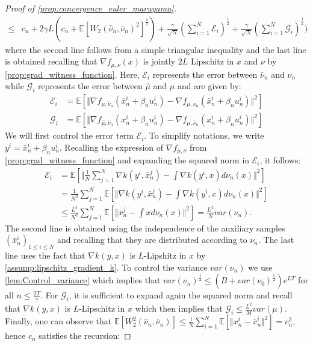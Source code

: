 \begin{proof}[Proof of \cref{prop:convergence_euler_maruyama}]
\begin{align*}
  \leq & c_{n}+2\gamma L(c_{n}+\mathbb{E}[W_{2}(\hat{\nu}_{n},\bar{\nu}_{n})^{2}]^{\frac{1}{2}})+\frac{\gamma}{\sqrt{N}}(\sum_{i=1}^{N}\mathcal{E}_{i})^{\frac{1}{2}}+\frac{\gamma}{\sqrt{N}}(\sum_{i=1}^{N}\mathcal{G}_{i})^{\frac{1}{2}})
\end{align*}
where the second line follows from a simple triangular inequality and the last line is obtained recalling that $\nabla f_{\mu,\nu}(x)$
is jointly $2L$ Lipschitz in $x$ and $\nu$ by \cref{prop:grad_witness_function}. Here, $\mathcal{E}_{i}$ represents the error between $\bar{\nu}_n$ and $\nu_n$ while $\mathcal{G}_{i}$  represents the error between $\hat{\mu}$ and $\mu$ and are given by: 
\begin{align*}
\mathcal{E}_{i} & =\mathbb{E}[\Vert\nabla f_{\mu,\bar{\nu}_{n}}(\bar{x}_{n}^{i}+\beta_{n}u_{n}^{i})-\nabla f_{\mu,\nu_{n}}(\bar{x}_{n}^{i}+\beta_{n}u_{n}^{i})\Vert^{2}]\\
\mathcal{G}_{i} & =\mathbb{E}[\Vert\nabla f_{\hat{\mu},\hat{\nu}_{n}}(x_{n}^{i}+\beta_{n}u_{n}^{i})-\nabla f_{\mu,\hat{\nu}_{n}}(x_{n}^{i}+\beta_{n}u_{n}^{i})\Vert^{2}]
\end{align*}
We will first control the error term $\mathcal{E}_i$. To simplify
notations, we write $y^{i}=\bar{x}_{n}^{i}+\beta_{n}u_{n}^{i}$. Recalling the expression of $\nabla f_{\mu,\nu}$ from \cref{prop:grad_witness_function} and expanding the squared norm in $\mathcal{E}_i$, it follows:
\begin{align*}
\mathcal{E}_{i} & =\mathbb{E}[\Vert\frac{1}{N}\sum_{j=1}^{N}\nabla k(y^{i},\bar{x}_{n}^{j})-\int\nabla k(y^{i},x)d\nu_{n}(x)\Vert^{2}]\\
 & =\frac{1}{N^{2}}\sum_{j=1}^{N}\mathbb{E}\left[\Vert\nabla k(y^{i},\bar{x}_{n}^{j})-\int\nabla k(y^{i},x)d\nu_{n}(x)\Vert^{2}\right]\\
 & \leq\frac{L^{2}}{N^{2}}\sum_{j=1}^{N}\mathbb{E}[\Vert\bar{x}_{n}^{j}-\int xd\nu_{n}(x)\Vert^{2}]=\frac{L^{2}}{N}var(\nu_{n}).
\end{align*}
The second line is obtained using the independence of the auxiliary samples $(\bar{x}^{i}_n)_{1\le i\le N}$ and recalling that they are distributed according to $\nu_{n}$. The last line uses the fact that $\nabla k(y,x)$ is $L$-Lipshitz in $x$ by \cref{assump:lipschitz_gradient_k}. To control the variance $var(\nu_n)$ we use  \cref{lem:Control_variance} which implies that $var(\nu_{n})^{\frac{1}{2}}\leq(B+var(\nu_{0})^{\frac{1}{2}})e^{LT}$ for all $n\leq\frac{2T}{\gamma}$.
For $\mathcal{G}_{i}$, it is sufficient to expand again the squared norm and recall that $\nabla k(y,x)$ is $L$-Lipschitz in $x$ which then implies that $\mathcal{G}_{i}\leq\frac{L^{2}}{M}var(\mu)$. Finally, one can observe that  $\mathbb{E}[W_{2}^{2}(\hat{\nu}_{n},\bar{\nu}_{n})]\leq\frac{1}{N}\sum_{i=1}^{N}\mathbb{E}\left[\Vert x_{n}^{i}-\bar{x}_{n}^{i}\Vert^{2}\right]=c_{n}^{2}$, hence $c_n$ satisfies the recursion:

\end{proof}
